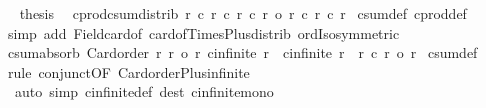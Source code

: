 \begin{isabellebody}
\ \isamarkupfalse%
\ {\isacharquery}{\kern0pt}thesis\ \isacommand{{\isachardot}{\kern0pt}}\isamarkupfalse%
\isanewline
{}\isamarkupfalse%
%
\endisatagproof
{\isafoldproof}%
%
\isadelimproof
\isanewline
%
\endisadelimproof
\isanewline
{}\isamarkupfalse%
\ cprod{\isacharunderscore}{\kern0pt}csum{\isacharunderscore}{\kern0pt}distrib{}{\isacharcolon}{\kern0pt}\ {\isachardoublequoteopen}r{}\ {\isacharasterisk}{\kern0pt}c\ r{}\ {\isacharplus}{\kern0pt}c\ r{}\ {\isacharasterisk}{\kern0pt}c\ r{}\ {\isacharequal}{\kern0pt}o\ r{}\ {\isacharasterisk}{\kern0pt}c\ {\isacharparenleft}{\kern0pt}r{}\ {\isacharplus}{\kern0pt}c\ r{}{\isacharparenright}{\kern0pt}{\isachardoublequoteclose}\isanewline
%
\isadelimproof
%
\endisadelimproof
%
\isatagproof
{}\isamarkupfalse%
\ csum{\isacharunderscore}{\kern0pt}def\ cprod{\isacharunderscore}{\kern0pt}def\ \isamarkupfalse%
\ {\isacharparenleft}{\kern0pt}simp\ add{\isacharcolon}{\kern0pt}\ Field{\isacharunderscore}{\kern0pt}card{\isacharunderscore}{\kern0pt}of\ card{\isacharunderscore}{\kern0pt}of{\isacharunderscore}{\kern0pt}Times{\isacharunderscore}{\kern0pt}Plus{\isacharunderscore}{\kern0pt}distrib\ ordIso{\isacharunderscore}{\kern0pt}symmetric{\isacharparenright}{\kern0pt}%
\endisatagproof
{\isafoldproof}%
%
\isadelimproof
\isanewline
%
\endisadelimproof
\isanewline
{}\isamarkupfalse%
\ csum{\isacharunderscore}{\kern0pt}absorb{}{\isacharprime}{\kern0pt}{\isacharcolon}{\kern0pt}\ {\isachardoublequoteopen}{\isasymlbrakk}Card{\isacharunderscore}{\kern0pt}order\ r{}{\isacharsemicolon}{\kern0pt}\ r{}\ {\isasymle}o\ r{}{\isacharsemicolon}{\kern0pt}\ cinfinite\ r{}\ {\isasymor}\ cinfinite\ r{}{\isasymrbrakk}\ {\isasymLongrightarrow}\ r{}\ {\isacharplus}{\kern0pt}c\ r{}\ {\isacharequal}{\kern0pt}o\ r{}{\isachardoublequoteclose}\isanewline
%
\isadelimproof
%
\endisadelimproof
%
\isatagproof
{}\isamarkupfalse%
\ csum{\isacharunderscore}{\kern0pt}def\ \isamarkupfalse%
\ {\isacharparenleft}{\kern0pt}rule\ conjunct{}{\isacharbrackleft}{\kern0pt}OF\ Card{\isacharunderscore}{\kern0pt}order{\isacharunderscore}{\kern0pt}Plus{\isacharunderscore}{\kern0pt}infinite{\isacharbrackright}{\kern0pt}{\isacharparenright}{\kern0pt}\isanewline
\ \ {\isacharparenleft}{\kern0pt}auto\ simp{\isacharcolon}{\kern0pt}\ cinfinite{\isacharunderscore}{\kern0pt}def\ dest{\isacharcolon}{\kern0pt}\ cinfinite{\isacharunderscore}{\kern0pt}mono{\isacharparenright}{\kern0pt}%

\end{isabellebody}
